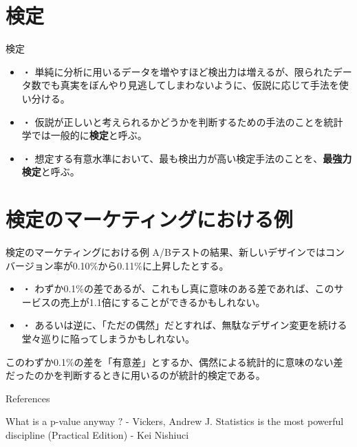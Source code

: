 \documentclass[dvipdfmx, autodetect-engine, aspectratio=169, 10.5pt]{beamer}
\begin{document}
\section{検定}

\begin{frame}{検定}
	\begin{itemize}
		\item ・ 単純に分析に用いるデータを増やすほど検出力は増えるが、限られたデータ数でも真実をぼんやり見逃してしまわないように、仮説に応じて手法を使い分ける。
        \vspace{5mm}
        \item ・ 仮説が正しいと考えられるかどうかを判断するための手法のことを統計学では一般的に\textbf{検定}と呼ぶ。
        \vspace{5mm}
        \item ・ 想定する有意水準において、最も検出力が高い検定手法のことを、\textbf{最強力検定}と呼ぶ。
	\end{itemize}
\end{frame}

\section{検定のマーケティングにおける例}

\begin{frame}{検定のマーケティングにおける例}
 A/Bテストの結果、新しいデザインではコンバージョン率が0.10$\%$から0.11$\%$に上昇したとする。
 \vspace{5mm}
     \begin{itemize}
        \item ・ わずか0.1$\%$の差であるが、これもし真に意味のある差であれば、このサービスの売上が1.1倍にすることができるかもしれない。
        \item ・ あるいは逆に、「ただの偶然」だとすれば、無駄なデザイン変更を続ける堂々巡りに陥ってしまうかもしれない。
	\end{itemize}
     \vspace{5mm}
このわずか0.1$\%$の差を「有意差」とするか、偶然による統計的に意味のない差だったのかを判断するときに用いるのが統計的検定である。
\end{frame}

\begin{frame}[allowframebreaks]{References}
	\begin{thebibliography}{9}
            What is a p-value anyway $?$ - Vickers, Andrew J.
            Statistics is the most powerful discipline (Practical Edition) - Kei Nishiuci
	\end{thebibliography}
\end{frame}
\end{document}
